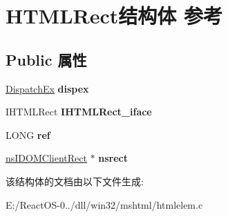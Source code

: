 \hypertarget{struct_h_t_m_l_rect}{}\section{H\+T\+M\+L\+Rect结构体 参考}
\label{struct_h_t_m_l_rect}
\subsection*{Public 属性}
\begin{DoxyCompactItemize}
\item 
\mbox{\label{struct_h_t_m_l_rect_acc90ce6ee21691a9a2809fed06a674bd}} 
\hyperlink{struct_dispatch_ex}{Dispatch\+Ex} {\bfseries dispex}
\item 
\mbox{\label{struct_h_t_m_l_rect_a163348d31d927c05aa3d49474a563709}} 
I\+H\+T\+M\+L\+Rect {\bfseries I\+H\+T\+M\+L\+Rect\+\_\+iface}
\item 
\mbox{\label{struct_h_t_m_l_rect_a64c4a7fc8db678100c1e4b15f9d1553d}} 
L\+O\+NG {\bfseries ref}
\item 
\mbox{\label{struct_h_t_m_l_rect_a03bc69dd3593bb023f5387a0f56b9741}} 
\hyperlink{interfacens_i_d_o_m_client_rect}{ns\+I\+D\+O\+M\+Client\+Rect} $\ast$ {\bfseries nsrect}
\end{DoxyCompactItemize}


该结构体的文档由以下文件生成\+:\begin{DoxyCompactItemize}
\item 
E\+:/\+React\+O\+S-\/0../dll/win32/mshtml/htmlelem.\+c\end{DoxyCompactItemize}
